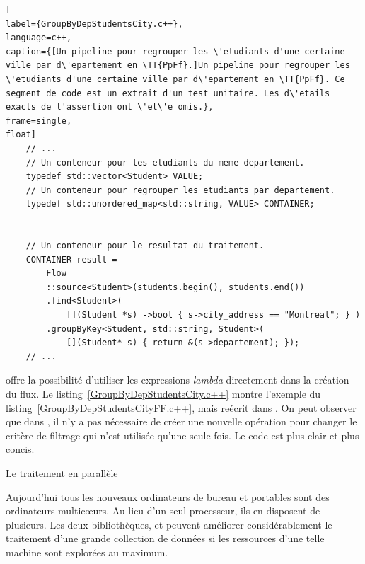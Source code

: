 \begin{lstlisting}[
label={GroupByDepStudentsCity.c++},
language=c++,
caption={[Un pipeline pour regrouper les \'etudiants d'une certaine ville par d\'epartement en \TT{PpFf}.]Un pipeline pour regrouper les \'etudiants d'une certaine ville par d\'epartement en \TT{PpFf}. Ce segment de code est un extrait d'un test unitaire. Les d\'etails exacts de l'assertion ont \'et\'e omis.},
frame=single,
float]
    // ...
    // Un conteneur pour les etudiants du meme departement.
    typedef std::vector<Student> VALUE;
    // Un conteneur pour regrouper les etudiants par departement.
    typedef std::unordered_map<std::string, VALUE> CONTAINER;

     
	// Un conteneur pour le resultat du traitement.
    CONTAINER result = 
        Flow
        ::source<Student>(students.begin(), students.end())
		.find<Student>( 
			[](Student *s) ->bool { s->city_address == "Montreal"; } )
        .groupByKey<Student, std::string, Student>(
        	[](Student* s) { return &(s->departement); });       
    // ...
\end{lstlisting}

 offre la possibilit\'e d'utiliser les expressions \emph{lambda} directement dans la cr\'eation du flux. Le listing~\ref{GroupByDepStudentsCity.c++} montre l'exemple du listing~\ref{GroupByDepStudentsCityFF.c++}, mais re\'ecrit dans . On peut observer que dans , il n'y a pas n\'ecessaire de cr\'eer une nouvelle op\'eration pour changer le crit\`ere de filtrage qui n'est utilis\'ee qu'une seule fois. Le code est plus clair et plus concis.

Le traitement en parall\`ele

Aujourd'hui tous les nouveaux ordinateurs de bureau et portables sont des ordinateurs multicœurs. Au lieu d'un seul processeur, ils en disposent de plusieurs. Les deux biblioth\`eques,  et  peuvent am\'eliorer consid\'erablement le traitement d'une grande collection de donn\'ees si les ressources d'une telle machine sont explor\'ees au maximum. 

